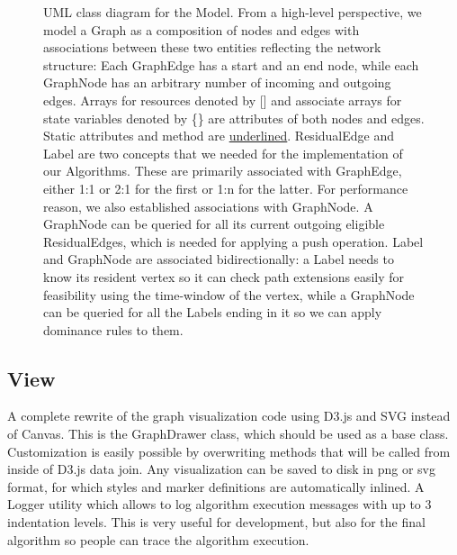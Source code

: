 \begin{figure}
\begin{tikzpicture}
\end{tikzpicture}
\caption{UML class diagram for the Model. From a high-level perspective, we model a Graph as a composition of nodes and edges with associations between these two entities reflecting the network structure: Each GraphEdge has a start and an end node, while each GraphNode has an arbitrary number of incoming and outgoing edges. Arrays for resources denoted by [] and associate arrays for state variables denoted by \{\} are attributes of both nodes and edges. Static attributes and method are \underline{underlined}. ResidualEdge and Label are two concepts that we needed for the implementation of our Algorithms. These are primarily associated with GraphEdge, either 1:1 or 2:1 for the first or 1:n for the latter. For performance reason, we also established associations with GraphNode. A GraphNode can be queried for all its current outgoing eligible ResidualEdges, which is needed for applying a push operation. Label and GraphNode are associated bidirectionally: a Label needs to know its resident vertex so it can check path extensions easily for feasibility using the time-window of the vertex, while a GraphNode can be queried for all the Labels ending in it so we can apply dominance rules to them.}
\label{fig:model}
\end{figure}



\subsection{View}
 A complete rewrite of the graph visualization code using D3.js and SVG instead of Canvas. This is the GraphDrawer class, which should be used as a base class. Customization is easily possible by overwriting methods that will be called from inside of D3.js data join. Any visualization can be saved to disk in png or svg format, for which styles and marker definitions are automatically inlined. A Logger utility which allows to log algorithm execution messages with up to 3 indentation levels. This is very useful for development, but also for the final algorithm so people can trace the algorithm execution.




